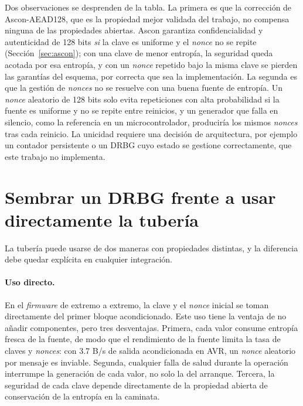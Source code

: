 Dos observaciones se desprenden de la tabla. La primera es que la corrección de Ascon-AEAD128, que es la propiedad mejor validada del trabajo, no compensa ninguna de las propiedades abiertas. Ascon garantiza confidencialidad y autenticidad de 128 bits \emph{si} la clave es uniforme y el \textit{nonce} no se repite (Sección~\ref{sec:ascon}); con una clave de menor entropía, la seguridad queda acotada por esa entropía, y con un \textit{nonce} repetido bajo la misma clave se pierden las garantías del esquema, por correcta que sea la implementación. La segunda es que la gestión de \textit{nonces} no se resuelve con una buena fuente de entropía. Un \textit{nonce} aleatorio de 128 bits solo evita repeticiones con alta probabilidad si la fuente es uniforme y no se repite entre reinicios, y un generador que falla en silencio, como la referencia en un microcontrolador, produciría los mismos \textit{nonces} tras cada reinicio. La unicidad requiere una decisión de arquitectura, por ejemplo un contador persistente o un DRBG cuyo estado se gestione correctamente, que este trabajo no implementa.

\section{Sembrar un DRBG frente a usar directamente la tubería}
\label{sec:drbg_vs_directo}

La tubería puede usarse de dos maneras con propiedades distintas, y la diferencia debe quedar explícita en cualquier integración.

\paragraph{Uso directo.} En el \textit{firmware} de extremo a extremo, la clave y el \textit{nonce} inicial se toman directamente del primer bloque acondicionado. Este uso tiene la ventaja de no añadir componentes, pero tres desventajas. Primera, cada valor consume entropía fresca de la fuente, de modo que el rendimiento de la fuente limita la tasa de claves y \textit{nonces}: con 3.7 B/s de salida acondicionada en AVR, un \textit{nonce} aleatorio por mensaje es inviable. Segunda, cualquier falla de salud durante la operación interrumpe la generación de cada valor, no solo la del arranque. Tercera, la seguridad de cada clave depende directamente de la propiedad abierta de conservación de la entropía en la caminata.

